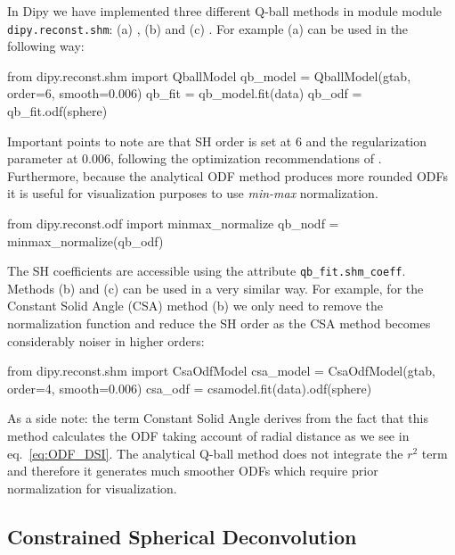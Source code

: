 \documentclass{bioinfo}
\begin{document}
In Dipy we have implemented three different Q-ball methods in module
module \texttt{dipy.reconst.shm}: (a)
\citet{descoteaux-angelino-etal:07}, (b) \citet{aganj-lenglet-etal:10}
and (c) \citet{tristan-vega-westin-etal:09}. For
example (a) can be used in the following way:
\begin{python}
from dipy.reconst.shm import QballModel
qb_model = QballModel(gtab, order=6, smooth=0.006)
qb_fit = qb_model.fit(data)
qb_odf = qb_fit.odf(sphere)
\end{python}
Important points to note are that SH order is set at $6$ and the regularization
parameter at $0.006$, following the optimization recommendations of
\citet{descoteaux-angelino-etal:06c}. Furthermore, because the
analytical ODF method produces more
rounded ODFs it is useful for visualization purposes to use \emph{min-max}
normalization.
\begin{python}
from dipy.reconst.odf import minmax_normalize
qb_nodf = minmax_normalize(qb_odf)
\end{python}
The SH coefficients are accessible using the attribute
\texttt{qb\_fit.shm\_coeff}. Methods (b) and (c) can be used in a very similar
way. For example, for the Constant Solid Angle (CSA)
\citep{aganj-lenglet-etal:10} method (b) we only need to remove the
normalization function and reduce the SH order as the CSA method becomes
considerably noiser in higher orders:
\begin{python}
from dipy.reconst.shm import CsaOdfModel
csa_model = CsaOdfModel(gtab, order=4,
                        smooth=0.006)
csa_odf = csamodel.fit(data).odf(sphere)
\end{python}
As a side note: the term Constant Solid Angle derives from the fact that this
method calculates the ODF taking account of radial distance as we see in
eq.~\ref{eq:ODF_DSI}. The analytical Q-ball method does not integrate the $r^2$
term and therefore it generates much smoother ODFs which require prior normalization
for visualization.

\subsection{Constrained Spherical Deconvolution}
\end{document}
